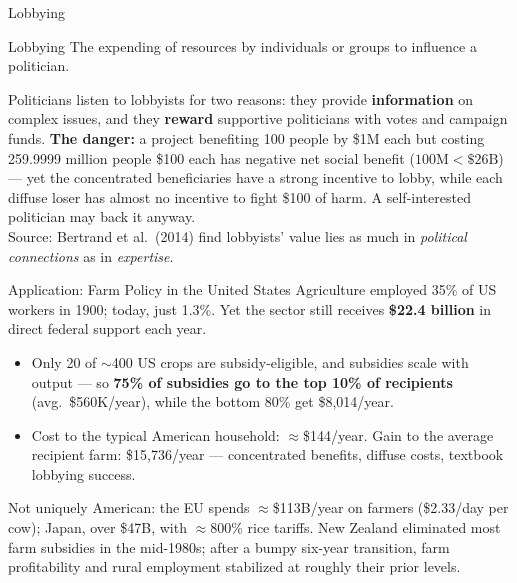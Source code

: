 \documentclass[11pt,aspectratio=169]{beamer}
\newcommand{\srcnote}[1]{{\footnotesize\color{wugray}Source: #1}}
\begin{document}
\begin{frame}{Lobbying}
  \begin{block}{Lobbying}
    The expending of resources by individuals or groups to influence a politician.
  \end{block}
  Politicians listen to lobbyists for two reasons: they provide \textbf{information} on complex issues, and they \textbf{reward} supportive politicians with votes and campaign funds.
  \vspace{0.4em}
  \small \textbf{The danger:} a project benefiting 100 people by \$1M each but costing 259.9999 million people \$100 each has negative net social benefit ($100\text{M} < \$26\text{B}$) --- yet the concentrated beneficiaries have a strong incentive to lobby, while each diffuse loser has almost no incentive to fight \$100 of harm. A self-interested politician may back it anyway.\\
  \srcnote{Bertrand et al.\ (2014) find lobbyists' value lies as much in \emph{political connections} as in \emph{expertise}.}
\end{frame}

\begin{frame}{Application: Farm Policy in the United States}
  Agriculture employed 35\% of US workers in 1900; today, just 1.3\%. Yet the sector still receives \textbf{\$22.4 billion} in direct federal support each year.
  \begin{itemize}
    \item Only 20 of $\sim$400 US crops are subsidy-eligible, and subsidies scale with output --- so \textbf{75\% of subsidies go to the top 10\% of recipients} (avg.\ \$560K/year), while the bottom 80\% get \$8,014/year.
    \item Cost to the typical American household: $\approx$\$144/year. Gain to the average recipient farm: \$15,736/year --- concentrated benefits, diffuse costs, textbook lobbying success.
  \end{itemize}
  \small Not uniquely American: the EU spends $\approx$\$113B/year on farmers (\$2.33/day per cow); Japan, over \$47B, with $\approx$800\% rice tariffs. New Zealand eliminated most farm subsidies in the mid-1980s; after a bumpy six-year transition, farm profitability and rural employment stabilized at roughly their prior levels.
\end{frame}
\end{document}
